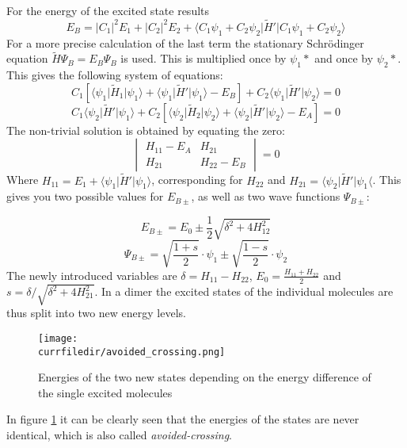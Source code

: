 For the energy of the excited state results
\begin{equation}
    E_B = \lvert C_1\rvert^2 E_1 + \lvert C_2\rvert^2 E_2 + \langle C_1\psi_1 + C_2\psi_2\lvert\tilde{H}'\rvert C_1\psi_1 + C_2\psi_2\rangle
\end{equation}
For a more precise calculation of the last term the stationary Schrödinger equation $\tilde{H}\Psi_B = E_B\Psi_B$ is used. This is multiplied once by $\psi_1*$ and once by $\psi_2*$. This gives the following system of equations:
\[ C_1 \left [\langle\psi_1\lvert\tilde{H}_1\rvert\psi_1\rangle+\langle\psi_1\lvert\tilde{H}'\rvert\psi_1\rangle - E_B\right] + C_2\langle\psi_1\lvert\tilde{H}'\rvert\psi_2\rangle = 0 \]
\[ C_1\langle\psi_2\lvert\tilde{H}'\rvert\psi_1\rangle + C_2 \left [\langle\psi_2\lvert\tilde{H}_2\rvert\psi_2\rangle+\langle\psi_2\lvert\tilde{H}'\rvert\psi_2\rangle - E_A\right] = 0 \]
The non-trivial solution is obtained by equating the zero:
\[ \begin{vmatrix}
    H_{11} - E_A & H_{21} \\
    H_{21} & H_{22} - E_B
   \end{vmatrix} = 0 \] 
Where $H_{11}=E_1+\langle\psi_1\lvert\tilde{H}'\rvert\psi_1\rangle$, corresponding for $H_{22}$ and $H_{21}=\langle\psi_2\lvert\tilde{H}'\rvert\psi_1\langle$. This gives you two possible values for $E_{B\pm}$, as well as two wave functions $\Psi_{B\pm}$:

\begin{equation}
    E_{B\pm} = E_0 \pm \frac{1}{2}\sqrt{\delta^2 + 4H_{12}^2}  
\end{equation}
\begin{equation}
    \Psi_{B\pm} = \sqrt{\frac{1+s}{2}}\cdot\psi_1 \pm \sqrt{\frac{1-s}{2}}\cdot\psi_2
\end{equation}
The newly introduced variables are $\delta = H_{11}-H_{22}$, $E_0 = \frac{H_{11}+H_{22}}{2}$ and $s = \delta/\sqrt{\delta^2+4H_{21}^2}$. In a dimer the excited states of the individual molecules are thus split into two new energy levels.
\begin{figure}
    \centering
    \texttt{[image: \\currfiledir/avoided\_crossing.png]}
    \caption{Energies of the two new states depending on the energy difference of the single excited molecules}
    \label{avoided_crossing}
\end{figure}
In figure \ref{avoided_crossing} it can be clearly seen that the energies of the states are never identical, which is also called \textit{avoided-crossing}.

